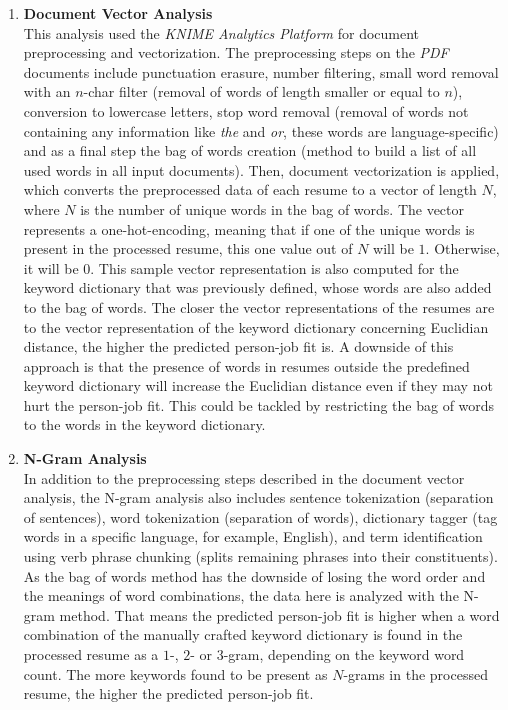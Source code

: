 \documentclass[draft,final]{thesisclass} %
\begin{document}
\begin{enumerate}
    \item \textbf{Document Vector Analysis}\\
    This analysis used the \textit{KNIME Analytics Platform} for document preprocessing and vectorization.
    The preprocessing steps on the \textit{PDF} documents include punctuation erasure, number filtering, small word removal with an $n$-char filter (removal of words of length smaller or equal to $n$), conversion to lowercase letters, stop word removal (removal of words not containing any information like \textit{the} and \textit{or}, these words are language-specific) and as a final step the bag of words creation (method to build a list of all used words in all input documents).
    Then, document vectorization is applied, which converts the preprocessed data of each resume to a vector of length $N$, where $N$ is the number of unique words in the bag of words.
    The vector represents a one-hot-encoding, meaning that if one of the unique words is present in the processed resume, this one value out of $N$ will be $1$. Otherwise, it will be $0$.
    This sample vector representation is also computed for the keyword dictionary that was previously defined, whose words are also added to the bag of words.
    The closer the vector representations of the resumes are to the vector representation of the keyword dictionary concerning Euclidian distance, the higher the predicted person-job fit is.
    A downside of this approach is that the presence of words in resumes outside the predefined keyword dictionary will increase the Euclidian distance even if they may not hurt the person-job fit.
    This could be tackled by restricting the bag of words to the words in the keyword dictionary.
    \item \textbf{N-Gram Analysis}\\
    In addition to the preprocessing steps described in the document vector analysis, the N-gram analysis also includes sentence tokenization (separation of sentences), word tokenization (separation of words), dictionary tagger (tag words in a specific language, for example, English), and term identification using verb phrase chunking (splits remaining phrases into their constituents).
    As the bag of words method has the downside of losing the word order and the meanings of word combinations, the data here is analyzed with the N-gram method.
    That means the predicted person-job fit is higher when a word combination of the manually crafted keyword dictionary is found in the processed resume as a $1$-, $2$- or $3$-gram, depending on the keyword word count.
    The more keywords found to be present as $N$-grams in the processed resume, the higher the predicted person-job fit.
\end{enumerate}
\end{document}
